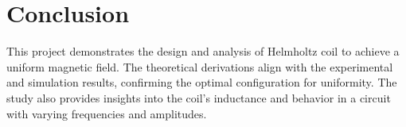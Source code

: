 \chapter{Conclusion}

This project demonstrates the design and analysis of Helmholtz coil to achieve a uniform magnetic field. The theoretical derivations align with the experimental and simulation results, confirming the optimal configuration for uniformity. The study also provides insights into the coil's inductance and behavior in a circuit with varying frequencies and amplitudes.

